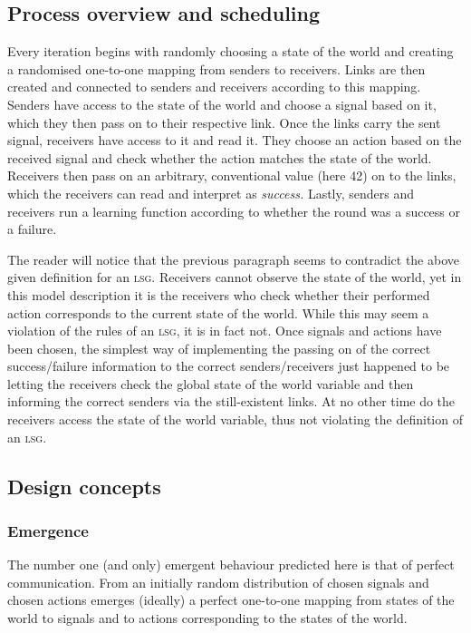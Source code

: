 \documentclass[DIV=calc,BCOR=0mm,pagesize]{scrartcl}
\newcommand{\lsg}{\textsc{lsg}}
\begin{document}
\subsection{Process overview and scheduling}
\label{ssec:modpro}
Every iteration begins with randomly choosing a state of the world and creating a randomised one-to-one mapping from senders to receivers.
Links are then created and connected to senders and receivers according to this mapping.
Senders have access to the state of the world and choose a signal based on it, which they then pass on to their respective link.
Once the links carry the sent signal, receivers have access to it and read it.
They choose an action based on the received signal and check whether the action matches the state of the world.
Receivers then pass on an arbitrary, conventional value (here 42) on to the links, which the receivers can read and interpret as \emph{success.}
Lastly, senders and receivers run a learning function according to whether the round was a success or a failure.

The reader will notice that the previous paragraph seems to contradict the above given definition for an \lsg.
Receivers cannot observe the state of the world, yet in this model description it is the receivers who check whether their performed action corresponds to the current state of the world.
While this may seem a violation of the rules of an \lsg, it is in fact not.
Once signals and actions have been chosen, the simplest way of implementing the passing on of the correct success/failure information to the correct senders/receivers just happened to be letting the receivers check the global state of the world variable and then informing the correct senders via the still-existent links.
At no other time do the receivers access the state of the world variable, thus not violating the definition of an \lsg.
 

\subsection{Design concepts}
\label{ssec:moddes}
\subsubsection{Emergence}
The number one (and only) emergent behaviour predicted here is that of perfect communication.
From an initially random distribution of chosen signals and chosen actions emerges (ideally) a perfect one-to-one mapping from states of the world to signals and to actions corresponding to the states of the world.
\end{document}
